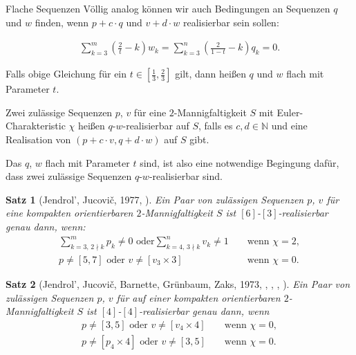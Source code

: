 \documentclass[10pt, notheorems]{beamer}
\newtheorem{theorem}{Satz}[section]
\newcommand{\nats}{\mathbb{N}}
\newcommand{\hdef}[1]{\textcolor{darkred2}{#1}}
\begin{document}
\begin{frame}{Flache Sequenzen}
  Völlig analog können wir auch Bedingungen an Sequenzen $q$ und $w$ finden, wenn $p+c\cdot q$ und $v+d\cdot w$ realisierbar sein sollen:
  \begin{block}{}
    \begin{align*}
      \sum_{k=3}^m \left(\frac{2}{t} - k \right) w_k = \sum_{k=3}^n \left( \frac{2}{1-t} - k \right) q_k = 0.
    \end{align*}
  \end{block}
  \pause
  Falls obige Gleichung für ein $t \in \left[\tfrac{1}{3}, \tfrac{2}{3}\right]$ gilt, dann heißen $q$ und $w$ \hdef{flach mit Parameter $t$}.
  \pause
  \begin{definition}
    Zwei zulässige Sequenzen $p$, $v$ für eine $2$-Mannigfaltigkeit $S$ mit {\sc Euler}-Charakteristic $\chi$ heißen \hdef{$q$-$w$-realisierbar auf $S$}, falls es $c, d \in \nats$ und eine Realisation von $(p + c \cdot v, q + d \cdot w)$ auf $S$ gibt.
  \end{definition}
  \pause
  Das $q$, $w$ flach mit Parameter $t$ sind, ist also eine notwendige Begingung dafür, dass zwei zulässige Sequenzen $q$-$w$-realisierbar sind.
\end{frame}

\begin{frame}
  \begin{theorem}[{\sc Jendrol', Jucovi{\v{c}}}, 1977, \cite{jendrol1977generalization}] \label{thm:eberhard:extended:3}
    Ein Paar von zulässigen Sequenzen $p$, $v$ für eine kompakten orientierbaren $2$-Mannigfaltigkeit $S$ ist $[6]$-$[3]$-realisierbar genau dann, wenn:
    \begin{align*}
      \sum_{k=3,\,2 \nmid k}^{m} p_k \neq 0 \text{ oder} \sum_{k=4,\,3 \nmid k}^n v_k \neq 1& &\text{ wenn } \chi = 2, \\
      p \neq [5, 7] \text{ oder } v \neq [v_3 \times 3]& &\text{ wenn } \chi = 0.
    \end{align*}
  \end{theorem}
  \pause
  \begin{theorem}[{\sc Jendrol', Jucovi{\v{c}}, Barnette, Grünbaum, Zaks}, 1973, \cite{jucovivc1973theorem}, \cite{barnette1971toroidal}, \cite{grunbaum1969planar}, \cite{zaks1971analogue}] \label{thm:eberhard:extended:4}
    Ein Paar von zulässigen Sequenzen $p$, $v$ für auf einer kompakten orientierbaren $2$-Mannigfaltigkeit $S$ ist $[4]$-$[4]$-realisierbar genau dann, wenn
    \begin{align*}
      p \neq [3, 5] \text{ oder } v \neq [v_4 \times 4]& &\text{ wenn } \chi = 0,\\
      p \neq [p_4 \times 4] \text{ oder } v \neq [3, 5]& &\text{ wenn } \chi = 0.
    \end{align*}
  \end{theorem}
\end{frame}
\end{document}
